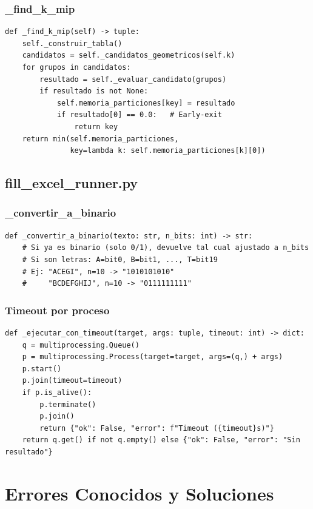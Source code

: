 \documentclass[12pt,a4paper]{article}
\begin{document}
\subsubsection{\_find\_k\_mip}
\begin{lstlisting}
def _find_k_mip(self) -> tuple:
    self._construir_tabla()
    candidatos = self._candidatos_geometricos(self.k)
    for grupos in candidatos:
        resultado = self._evaluar_candidato(grupos)
        if resultado is not None:
            self.memoria_particiones[key] = resultado
            if resultado[0] == 0.0:   # Early-exit
                return key
    return min(self.memoria_particiones,
               key=lambda k: self.memoria_particiones[k][0])
\end{lstlisting}

\subsection{fill\_excel\_runner.py}

\subsubsection{\_convertir\_a\_binario}
\begin{lstlisting}
def _convertir_a_binario(texto: str, n_bits: int) -> str:
    # Si ya es binario (solo 0/1), devuelve tal cual ajustado a n_bits
    # Si son letras: A=bit0, B=bit1, ..., T=bit19
    # Ej: "ACEGI", n=10 -> "1010101010"
    #     "BCDEFGHIJ", n=10 -> "0111111111"
\end{lstlisting}

\subsubsection{Timeout por proceso}
\begin{lstlisting}
def _ejecutar_con_timeout(target, args: tuple, timeout: int) -> dict:
    q = multiprocessing.Queue()
    p = multiprocessing.Process(target=target, args=(q,) + args)
    p.start()
    p.join(timeout=timeout)
    if p.is_alive():
        p.terminate()
        p.join()
        return {"ok": False, "error": f"Timeout ({timeout}s)"}
    return q.get() if not q.empty() else {"ok": False, "error": "Sin resultado"}
\end{lstlisting}

\section{Errores Conocidos y Soluciones}
\end{document}
